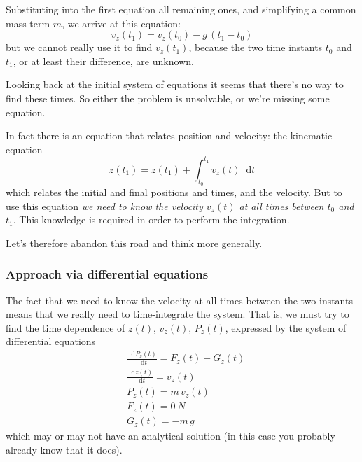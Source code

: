 \documentclass[a4paper,12pt,%
onecolumn,oneside,%
british%
]{memoir}
\newcommand*{\di}{\mathop{}\!\mathrm{d}}%
\renewcommand*{\|}[1][]{\nonscript\:#1\vert\nonscript\:\mathopen{}}
\newcommand*{\yti}{t_{0}}
\newcommand*{\ytf}{t_{1}}
\newcommand*{\dt}{\di t}
\newcommand*{\ym}{m}%
\begin{document}
Substituting into the first equation all remaining ones, and simplifying a common mass term $\ym$, we arrive at this equation:
\begin{equation*}
  v_{z}(\ytf) = v_{z}(\yti) - g\,(\ytf - \yti)
\end{equation*}
but we cannot really use it to find $v_{z}(\ytf)$, because the two time instants $\yti$ and $\ytf$, or at least their difference, are unknown.

Looking back at the initial system of equations it seems that there's no way to find these times. So either the problem is unsolvable, or we're missing some equation.

In fact there is an equation that relates position and velocity: the kinematic equation
\begin{equation*}
  z(\ytf) = z(\ytf) + \int_{\yti}^{\ytf} \!\!v_{z}(t)\dt
\end{equation*}
which relates the initial and final positions and times, and the velocity. But to use this equation \emph{we need to know the velocity $v_{z}(t)$ at all times between $\yti$ and $\ytf$}. This knowledge is required in order to perform the integration.

Let's therefore abandon this road and think more generally.


\subsubsection{Approach via differential equations}

The fact that we need to know the velocity at all times between the two instants means that we really need to time-integrate the system. That is, we must try to find the time dependence of $z(t)$, $v_{z}(t)$, $P_{z}(t)$, expressed by the system of differential equations
\begin{equation*}
  \begin{aligned}
    &\frac{\di P_{z}(t)}{\dt} = F_{z}(t) + G_{z}(t)
    \\
    &\frac{\di z(t)}{\dt} = v_{z}(t)
    \\
    &P_{z}(t) = \ym\,v_{z}(t)
    \\
    &F_{z}(t) = \qty{0}{N}
    \\
    &G_{z}(t) = -\ym\,g
  \end{aligned}
\end{equation*}
which may or may not have an analytical solution (in this case you probably already know that it does).
\end{document}
